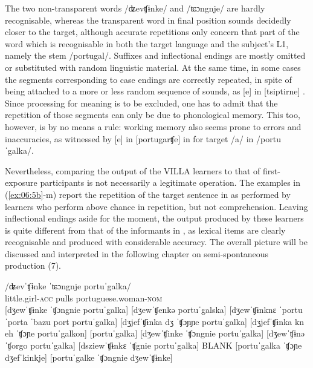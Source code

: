 The two non-transparent words /ʥevʧɨnke/ and /ʨɔngnje/ are hardly recognisable, whereas the transparent word in final position sounds decidedly closer to the target, although accurate repetitions only concern that part of the word which is recognisable in both the target language and the subject's L1, namely the stem /portugal/. Suffixes and inflectional endings are mostly omitted or substituted with random linguistic material. At the same time, in some cases the segments corresponding to case endings are correctly repeated, in spite of being attached to a more or less random sequence of sounds, as [e] in [tsiptirne] . Since processing for meaning is to be excluded, one has to admit that the repetition of those segments can only be due to phonological memory. This too, however, is by no means a rule: working memory also seems prone to errors and inaccuracies, as witnessed by [e] in [portugarʧe] in  for target /a/ in /portuˈgalka/.

Nevertheless, comparing the output of the VILLA learners to that of first-exposure participants is not necessarily a legitimate operation. The examples in (\ref{ex:06:5b}-m) report the repetition of the target sentence in  as performed by learners who perform above chance in repetition, but not comprehension. Leaving inflectional endings aside for the moment, the output produced by these learners is quite different from that of the informants in , as lexical items are clearly recognisable and produced with considerable accuracy. The overall picture will be discussed and interpreted in the following chapter on semi-spontaneous production (7).

\ea%
    \label{ex:06:5}
    \ea\label{ex:06:5a}
    \gll    /ʥevˈʧɨnke   ˈʨɔngnje   portuˈgalka/\\
            little.girl-\textsc{acc}   pulls     portuguese.woman-\textsc{nom}\\
    \ex\label{ex:06:5b}
    [dʒewˈʧɨnke ˈʧɔngnie portuˈgalka]
    \ex\label{ex:06:5c}
    [dʒewˈʧenkə portuˈgalska]
    \ex\label{ex:06:5d}
    [dʒewˈʧɨnknɛ ˈportu ˈporta ˈbazu port portuˈgalka]
    \ex\label{ex:06:5e}
    [dʒjefˈʧɨnka dʒ ˈʧɔɲɲe portuˈgalka]
    \ex\label{ex:06:5f}
    [dʒjefˈʧɨnka kn eh ˈʧɔɲe portuˈgalkon]
    \ex\label{ex:06:5g}
    [portuˈgalka]
    \ex\label{ex:06:5h}
    [dʒewˈʧinke ˈʧɔngnie portuˈgalka]
    \ex\label{ex:06:5i}
    [dʒewˈʧɨnə ˈʧorgo portuˈgalka]
    \ex\label{ex:06:5j}
    [dsziewˈʧɨnkɛ ˈʧgnie portuˈgalka]
    \ex\label{ex:06:5k}
    BLANK
    \ex\label{ex:06:5l}
    [portuˈgalka ˈʧɔɲe dʒefˈkinkje]
    \ex\label{ex:06:5m}
    [portuˈgalke ˈʧɔngnie dʒewˈʧɨnke]
    \z
\z

